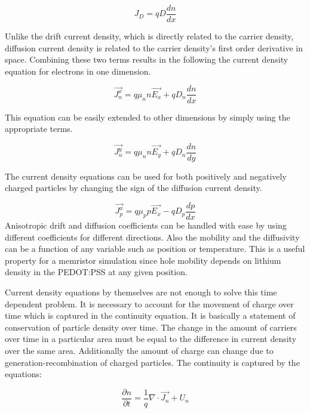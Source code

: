 \begin{doublespace}
\begin{equation}
J_D=qD\frac{dn}{dx}
\end{equation}

Unlike the drift current density, which is directly related to the carrier density, diffusion current density is related to the carrier density's first order derivative in space. Combining these two terms results in the following the current density equation for electrons in one dimension.

\begin{equation}
\vec{J_n^x}=q \mu_{n} n \vec{E_x}+qD_{n} \frac{dn}{dx} 
\label{cdenn}
\end{equation}

This equation can be easily extended to other dimensions by simply using the appropriate terms.

\begin{equation}
\vec{J_n^y}=q \mu_{n} n \vec{E_y}+qD_{n} \frac{dn}{dy} 
\end{equation}

The current density equations can be used for both positively and negatively charged particles by changing the sign of the diffusion current density.

\begin{equation}
\vec{J_p^x}=q \mu_{p} p \vec{E_x}-qD_{p} \frac{dp}{dx} 
\label{cdenp}
\end{equation}
Anisotropic drift and diffusion coefficients can be handled with ease by using different coefficients for different directions. Also the mobility and the diffusivity can be a function of any variable such as position or temperature. This is a useful property for a memristor simulation since hole mobility depends on lithium density in the PEDOT:PSS at any given position. 

Current density equations by themselves are not enough to solve this time dependent problem. It is necessary to account for the movement of charge over time which is captured in the continuity equation. It is basically a statement of conservation of particle density over time. The change in the amount of carriers over time in a particular area must be equal to the difference in current density over the same area. Additionally the amount of charge can change due to generation-recombination of charged particles. The continuity is captured by the equations:


\begin{equation}
\frac{\partial n}{\partial t}=\frac{1}{q}\nabla \cdot \vec{J_n}+U_{n}
\label{conn}
\end{equation}


\end{doublespace}
